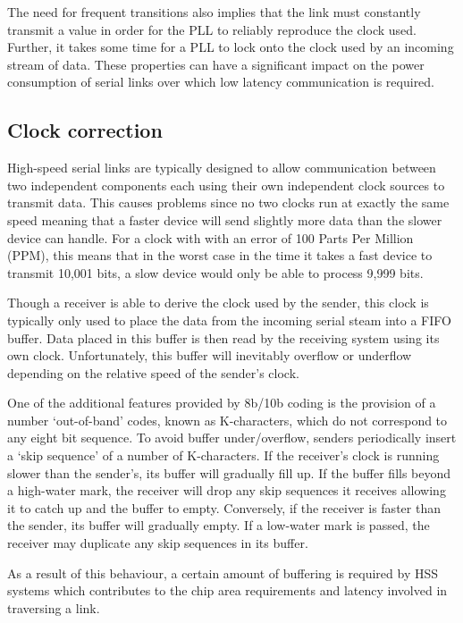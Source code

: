 			The need for frequent transitions also implies that the link must
			constantly transmit a value in order for the PLL to reliably reproduce the
			clock used. Further, it takes some time for a PLL to lock onto the clock
			used by an incoming stream of data. These properties can have a
			significant impact on the power consumption of serial links over which low
			latency communication is required.
		
		\subsection{Clock correction}
			
			High-speed serial links are typically designed to allow communication
			between two independent components each using their own independent clock
			sources to transmit data. This causes problems since no two clocks run at
			exactly the same speed meaning that a faster device will send slightly
			more data than the slower device can handle. For a clock with with an
			error of 100 Parts Per Million (PPM), this means that in the worst case in
			the time it takes a fast device to transmit 10,001 bits, a slow device
			would only be able to process 9,999 bits.
			
			Though a receiver is able to derive the clock used by the sender, this
			clock is typically only used to place the data from the incoming serial
			steam into a FIFO buffer. Data placed in this buffer is then read by the
			receiving system using its own clock. Unfortunately, this buffer will
			inevitably overflow or underflow depending on the relative speed of the
			sender's clock.
			
			One of the additional features provided by 8b/10b coding is the provision
			of a number `out-of-band' codes, known as K-characters, which do not
			correspond to any eight bit sequence. To avoid buffer under/overflow,
			senders periodically insert a `skip sequence' of a number of K-characters.
			If the receiver's clock is running slower than the sender's, its buffer
			will gradually fill up. If the buffer fills beyond a high-water mark, the
			receiver will drop any skip sequences it receives allowing it to catch up
			and the buffer to empty. Conversely, if the receiver is faster than the
			sender, its buffer will gradually empty.  If a low-water mark is passed,
			the receiver may duplicate any skip sequences in its buffer.
			
			As a result of this behaviour, a certain amount of buffering is required
			by HSS systems which contributes to the chip area requirements and latency
			involved in traversing a link.
		
